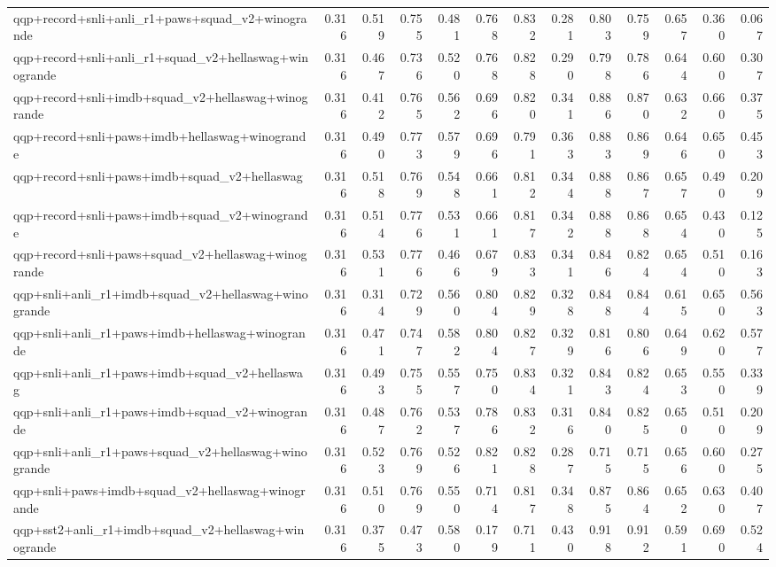\begin{table}[t]
\begin{tabular}{lrrrrrrrrrrrr}
    qqp+record+snli+anli\_r1+paws+squad\_v2+winogrande & 0.316 & 0.519 & 0.755 & 0.481 & 0.768 & 0.832 & 0.281 & 0.803 & 0.759 & 0.657 & 0.360 & 0.067 \\
    qqp+record+snli+anli\_r1+squad\_v2+hellaswag+winogrande & 0.316 & 0.467 & 0.736 & 0.520 & 0.768 & 0.828 & 0.290 & 0.798 & 0.786 & 0.644 & 0.600 & 0.307 \\
    qqp+record+snli+imdb+squad\_v2+hellaswag+winogrande & 0.316 & 0.412 & 0.765 & 0.562 & 0.696 & 0.820 & 0.341 & 0.886 & 0.870 & 0.632 & 0.660 & 0.375 \\
    qqp+record+snli+paws+imdb+hellaswag+winogrande & 0.316 & 0.490 & 0.773 & 0.579 & 0.696 & 0.791 & 0.363 & 0.883 & 0.869 & 0.646 & 0.650 & 0.453 \\
    qqp+record+snli+paws+imdb+squad\_v2+hellaswag & 0.316 & 0.518 & 0.769 & 0.548 & 0.661 & 0.812 & 0.344 & 0.888 & 0.867 & 0.657 & 0.490 & 0.209 \\
    qqp+record+snli+paws+imdb+squad\_v2+winogrande & 0.316 & 0.514 & 0.776 & 0.531 & 0.661 & 0.817 & 0.342 & 0.888 & 0.868 & 0.654 & 0.430 & 0.125 \\
    qqp+record+snli+paws+squad\_v2+hellaswag+winogrande & 0.316 & 0.531 & 0.776 & 0.466 & 0.679 & 0.833 & 0.341 & 0.846 & 0.824 & 0.654 & 0.510 & 0.163 \\
    qqp+snli+anli\_r1+imdb+squad\_v2+hellaswag+winogrande & 0.316 & 0.314 & 0.729 & 0.560 & 0.804 & 0.829 & 0.328 & 0.848 & 0.844 & 0.615 & 0.650 & 0.563 \\
    qqp+snli+anli\_r1+paws+imdb+hellaswag+winogrande & 0.316 & 0.471 & 0.747 & 0.582 & 0.804 & 0.827 & 0.329 & 0.816 & 0.806 & 0.649 & 0.620 & 0.577 \\
    qqp+snli+anli\_r1+paws+imdb+squad\_v2+hellaswag & 0.316 & 0.493 & 0.755 & 0.557 & 0.750 & 0.834 & 0.321 & 0.843 & 0.824 & 0.653 & 0.550 & 0.339 \\
    qqp+snli+anli\_r1+paws+imdb+squad\_v2+winogrande & 0.316 & 0.487 & 0.762 & 0.537 & 0.786 & 0.832 & 0.316 & 0.840 & 0.825 & 0.650 & 0.510 & 0.209 \\
    qqp+snli+anli\_r1+paws+squad\_v2+hellaswag+winogrande & 0.316 & 0.523 & 0.769 & 0.526 & 0.821 & 0.828 & 0.287 & 0.715 & 0.715 & 0.656 & 0.600 & 0.275 \\
    qqp+snli+paws+imdb+squad\_v2+hellaswag+winogrande & 0.316 & 0.510 & 0.769 & 0.550 & 0.714 & 0.817 & 0.348 & 0.875 & 0.864 & 0.652 & 0.630 & 0.407 \\
    qqp+sst2+anli\_r1+imdb+squad\_v2+hellaswag+winogrande & 0.316 & 0.375 & 0.473 & 0.580 & 0.179 & 0.711 & 0.430 & 0.918 & 0.912 & 0.591 & 0.690 & 0.524 \\

\end{tabular}
\end{table}
